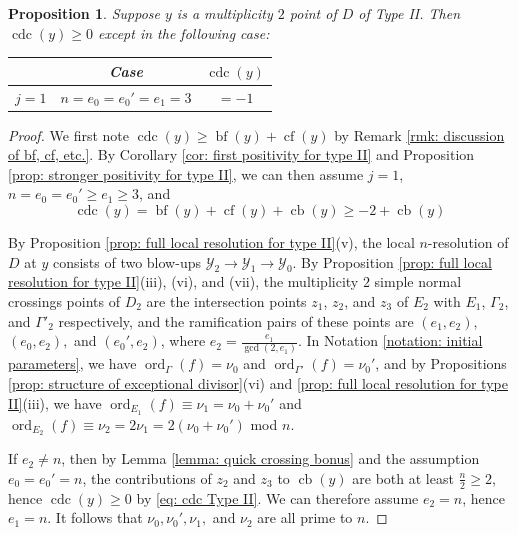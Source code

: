 \documentclass[12pt]{amsart}
\numberwithin{equation}{section}
\newtheorem{prop}[equation]{Proposition}
\theoremstyle{definition}
\newcommand{\Y}{\mathcal{Y}}
\DeclareMathOperator{\blf}{bf}
\DeclareMathOperator{\cf}{cf}
\DeclareMathOperator{\cb}{cb}
\DeclareMathOperator{\cdc}{cdc}
\DeclareMathOperator{\ord}{ord}
\begin{document}
\begin{prop}\label{prop: full positivity for type II}
    Suppose $y$ is a multiplicity $2$ point of $D$ of Type II. Then  $\cdc(y)\geq0$ except in the following case:
    \begin{table}[h!]
    \centering    
    \renewcommand{\arraystretch}{1.4}
    \begin{tabular}{|cc|c|}
        \hline
        & \textbf{\textup{Case}} & $\cdc(y)$ \\
        \hline
        $j=1$ & $n=e_0=e_0'=e_1=3$ & $=-1$ \\
        \hline
    \end{tabular}
    \end{table}
\end{prop}
\begin{proof}
    We first note $\cdc(y)\geq\blf(y)+\cf(y)$ by Remark \ref{rmk: discussion of bf, cf, etc.}. By Corollary \ref{cor: first positivity for type II} and Proposition \ref{prop: stronger positivity for type II}, we can then assume $j=1$, $n=e_0=e_0'\geq e_1\geq 3$, and
    \begin{equation}\label{eq: cdc Type II}
        \cdc(y)=\blf(y)+\cf(y)+\cb(y)\geq-2+\cb(y)
    \end{equation}
    
    By Proposition \ref{prop: full local resolution for type II}(v), the local $n$-resolution of $D$ at $y$ consists of two blow-ups $\Y_2\to\Y_1\to\Y_0$. By Proposition \ref{prop: full local resolution for type II}(iii), (vi), and (vii), the multiplicity $2$ simple normal crossings points of $D_2$ are the intersection points $z_1$, $z_2$, and $z_3$ of $E_2$ with $E_1$, $\Gamma_2$, and $\Gamma'_2$ respectively, and the ramification pairs of these points are $(e_1,e_2),$ $(e_0,e_2),$ and $(e_0',e_2)$, where $e_2=\frac{e_1}{\gcd(2,e_1)}$. In Notation \ref{notation: initial parameters}, we have $\ord_{\Gamma}(f)=\nu_0$ and $\ord_{\Gamma'}(f)=\nu_0'$, and by Propositions \ref{prop: structure of exceptional divisor}(vi) and \ref{prop: full local resolution for type II}(iii), we have $\ord_{E_1}(f)\equiv\nu_1=\nu_0+\nu_0'$ and $\ord_{E_2}(f)\equiv \nu_2=2\nu_1=2(\nu_0+\nu_0')$ mod $n$.
    
    If $e_2\neq n$, then by Lemma \ref{lemma: quick crossing bonus} and the assumption $e_0=e_0'=n$, the contributions of $z_2$ and $z_3$ to $\cb(y)$ are both at least $\frac{n}{2}\geq 2$, hence $\cdc(y)\geq0$ by \eqref{eq: cdc Type II}. We can therefore assume $e_2=n$, hence $e_1=n$. It follows that $\nu_0,\nu_0',\nu_1,$ and $\nu_2$ are all prime to $n$. 
    

\end{proof}
\end{document}
